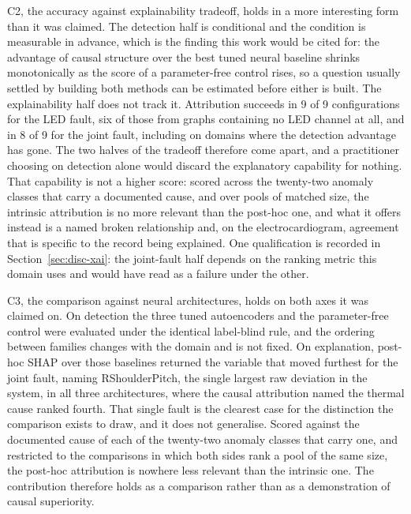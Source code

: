 C2, the accuracy against explainability tradeoff, holds in a more interesting form than it was claimed. The detection half is conditional and the condition is measurable in advance, which is the finding this work would be cited for: the advantage of causal structure over the best tuned neural baseline shrinks monotonically as the score of a parameter-free control rises, so a question usually settled by building both methods can be estimated before either is built. The explainability half does not track it. Attribution succeeds in 9 of 9 configurations for the LED fault, six of those from graphs containing no LED channel at all, and in 8 of 9 for the joint fault, including on domains where the detection advantage has gone. The two halves of the tradeoff therefore come apart, and a practitioner choosing on detection alone would discard the explanatory capability for nothing. That capability is not a higher score: scored across the twenty-two anomaly classes that carry a documented cause, and over pools of matched size, the intrinsic attribution is no more relevant than the post-hoc one, and what it offers instead is a named broken relationship and, on the electrocardiogram, agreement that is specific to the record being explained. One qualification is recorded in Section~\ref{sec:disc-xai}: the joint-fault half depends on the ranking metric this domain uses and would have read as a failure under the other.

C3, the comparison against neural architectures, holds on both axes it was claimed on. On detection the three tuned autoencoders and the parameter-free control were evaluated under the identical label-blind rule, and the ordering between families changes with the domain and is not fixed. On explanation, post-hoc SHAP over those baselines returned the variable that moved furthest for the joint fault, naming RShoulderPitch, the single largest raw deviation in the system, in all three architectures, where the causal attribution named the thermal cause ranked fourth. That single fault is the clearest case for the distinction the comparison exists to draw, and it does not generalise. Scored against the documented cause of each of the twenty-two anomaly classes that carry one, and restricted to the comparisons in which both sides rank a pool of the same size, the post-hoc attribution is nowhere less relevant than the intrinsic one. The contribution therefore holds as a comparison rather than as a demonstration of causal superiority.


